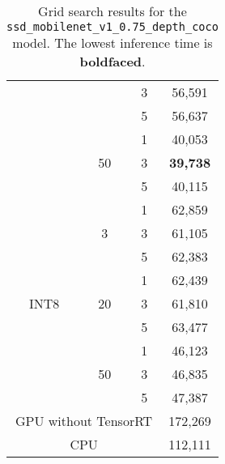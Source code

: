 \begin{table}[]
\begin{tabular}{cccc}
		\multicolumn{1}{|c|}{}   & \multicolumn{1}{c|}{}          & \multicolumn{1}{c|}{3}  & \multicolumn{1}{c|}{56,591}    \\ \cline{3-4} 
		\multicolumn{1}{|c|}{}   & \multicolumn{1}{c|}{}          & \multicolumn{1}{c|}{5}  & \multicolumn{1}{c|}{56,637}    \\ \cline{2-4} 
		\multicolumn{1}{|c|}{}   & \multicolumn{1}{c|}{\multirow{3}{*}{50}} & \multicolumn{1}{c|}{1}  & \multicolumn{1}{c|}{40,053}    \\ \cline{3-4} 
		\multicolumn{1}{|c|}{}   & \multicolumn{1}{c|}{}          & \multicolumn{1}{c|}{3}  & \multicolumn{1}{c|}{\textbf{39,738}}    \\ \cline{3-4} 
		\multicolumn{1}{|c|}{}   & \multicolumn{1}{c|}{}          & \multicolumn{1}{c|}{5}  & \multicolumn{1}{c|}{40,115}    \\ \hline
		\multicolumn{1}{|c|}{\multirow{9}{*}{INT8}} & \multicolumn{1}{c|}{\multirow{3}{*}{3}}  & \multicolumn{1}{c|}{1}  & \multicolumn{1}{c|}{62,859}    \\ \cline{3-4} 
		\multicolumn{1}{|c|}{}   & \multicolumn{1}{c|}{}          & \multicolumn{1}{c|}{3}  & \multicolumn{1}{c|}{61,105}    \\ \cline{3-4} 
		\multicolumn{1}{|c|}{}   & \multicolumn{1}{c|}{}          & \multicolumn{1}{c|}{5}  & \multicolumn{1}{c|}{62,383}    \\ \cline{2-4} 
		\multicolumn{1}{|c|}{}   & \multicolumn{1}{c|}{\multirow{3}{*}{20}} & \multicolumn{1}{c|}{1}  & \multicolumn{1}{c|}{62,439}    \\ \cline{3-4} 
		\multicolumn{1}{|c|}{}   & \multicolumn{1}{c|}{}          & \multicolumn{1}{c|}{3}  & \multicolumn{1}{c|}{61,810}    \\ \cline{3-4} 
		\multicolumn{1}{|c|}{}   & \multicolumn{1}{c|}{}          & \multicolumn{1}{c|}{5}  & \multicolumn{1}{c|}{63,477}    \\ \cline{2-4} 
		\multicolumn{1}{|c|}{}   & \multicolumn{1}{c|}{\multirow{3}{*}{50}} & \multicolumn{1}{c|}{1}  & \multicolumn{1}{c|}{46,123}    \\ \cline{3-4} 
		\multicolumn{1}{|c|}{}   & \multicolumn{1}{c|}{}          & \multicolumn{1}{c|}{3}  & \multicolumn{1}{c|}{46,835}    \\ \cline{3-4} 
		\multicolumn{1}{|c|}{}   & \multicolumn{1}{c|}{}          & \multicolumn{1}{c|}{5}  & \multicolumn{1}{c|}{47,387}    \\ \hline
		\multicolumn{3}{|c|}{GPU without TensorRT}       & \multicolumn{1}{c|}{172,269}   \\ \hline
		\multicolumn{3}{|c|}{CPU}        & \multicolumn{1}{c|}{112,111}   \\ \hline
	\end{tabular}
	\caption{Grid search results for the \texttt{ssd\_mobilenet\_v1\_0.75\_depth\_coco} model. The lowest inference time is \textbf{boldfaced}.}
	\label{tab:3_ssd_trt_results}
\end{table}


